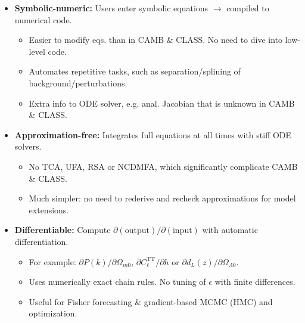 \documentclass[25pt, a0paper, portrait]{tikzposter}
\begin{document}
\begin{columns}
{    \begin{itemize}
    \item \textbf{Symbolic-numeric:} Users enter symbolic equations $\rightarrow$ compiled to numerical code.
    \begin{itemize}
    \item Easier to modify eqs. than in CAMB \& CLASS. No need to dive into low-level code.
    \item Automates repetitive tasks, such as separation/splining of background/perturbations.
    \item Extra info to ODE solver, e.g. anal. Jacobian that is unknown in CAMB \& CLASS.
    \end{itemize}
    \item \textbf{Approximation-free:} Integrates full equations at all times with stiff ODE solvers.
    \begin{itemize}
    \item No TCA, UFA, RSA or NCDMFA, which significantly complicate CAMB \& CLASS.
    \item Much simpler: no need to rederive and recheck approximations for model extensions.
    \end{itemize}
    \item \textbf{Differentiable:} Compute $\partial(\mathrm{output})/\partial(\mathrm{input})$ with automatic differentiation.
    \begin{itemize}
	\item For example: $\partial P(k) / \partial \Omega_{m0}$, $\partial C_\ell^\text{TT} / \partial h$ or $\partial d_L(z) / \partial \Omega_{\Lambda 0}$.
    \item Uses numerically exact chain rules. No tuning of $\epsilon$ with finite differences.
    \item Useful for Fisher forecasting \& gradient-based MCMC (HMC) and optimization.
    \end{itemize}
    \end{itemize}
}


\end{columns}
\end{document}

